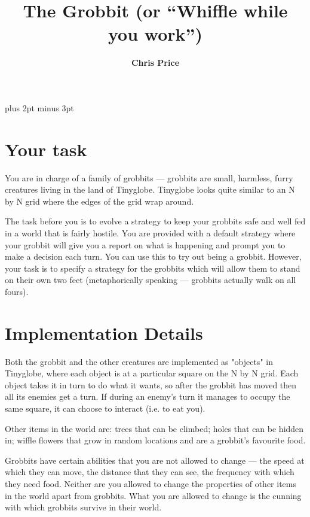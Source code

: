 
\title{\bf The Grobbit (or ``Whiffle while you work'')}

\author{\bf Chris Price}

\parskip=6pt plus 2pt minus 3pt
\parindent=0pt
\topsep=0pt


\maketitle

\section{Your task}

You are in charge of a family of grobbits --- grobbits are small, harmless,
furry creatures living in the land of Tinyglobe. Tinyglobe looks quite
similar to an N by N grid where the edges of the grid wrap around.

The task before you is to evolve a strategy to keep your grobbits safe
and well fed in a world that is fairly hostile. You are provided with a
default strategy where your grobbit will give you a report on what is
happening and prompt you to make a decision each turn. You can use this
to try out being a grobbit. However, your task is to specify a strategy
for the grobbits which will allow them to stand on their own two feet
(metaphorically speaking --- grobbits actually walk on all fours).

\section{Implementation Details}

Both the grobbit and the other creatures are implemented as "objects"
in Tinyglobe, where each object is at a particular square on the N by N
grid. Each object takes it in turn to do what it wants, so after the grobbit
has moved then all its enemies get a turn. If during an enemy's turn
it manages to occupy the same square, it can choose to interact
(i.e. to eat you).

Other items in the world are: trees that can be climbed; holes that can
be hidden in; wiffle flowers that grow in random locations and are a
grobbit's favourite food.

Grobbits have certain abilities that you are not allowed to change ---
the speed at which they can move, the distance that they can see, the
frequency with which they need food. Neither are you allowed to change
the properties of other items in the world apart from grobbits. What
you are allowed to change is the cunning with which grobbits survive
in their world.

